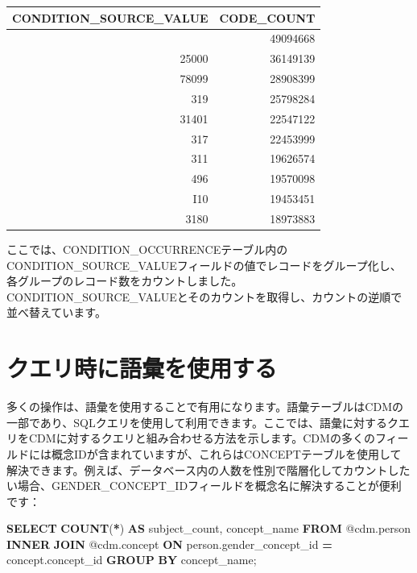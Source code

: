 \documentclass[
  11pt]{book}
\newenvironment{Shaded}{\begin{snugshade}}{\end{snugshade}}
\newcommand{\FunctionTok}[1]{\textcolor[rgb]{0.13,0.29,0.53}{\textbf{#1}}}
\newcommand{\KeywordTok}[1]{\textcolor[rgb]{0.13,0.29,0.53}{\textbf{#1}}}
\newcommand{\NormalTok}[1]{#1}
\newcommand{\OperatorTok}[1]{\textcolor[rgb]{0.81,0.36,0.00}{\textbf{#1}}}
\theoremstyle{definition}
\theoremstyle{definition}
\theoremstyle{definition}
\theoremstyle{definition}
\theoremstyle{remark}
\begin{document}
\begin{longtable}[]{@{}rr@{}}
\toprule\noalign{}
CONDITION\_SOURCE\_VALUE & CODE\_COUNT \\
\midrule\noalign{}
\endhead
\bottomrule\noalign{}
\endlastfoot
4019 & 49094668 \\
25000 & 36149139 \\
78099 & 28908399 \\
319 & 25798284 \\
31401 & 22547122 \\
317 & 22453999 \\
311 & 19626574 \\
496 & 19570098 \\
I10 & 19453451 \\
3180 & 18973883 \\
\end{longtable}

ここでは、CONDITION\_OCCURRENCEテーブル内のCONDITION\_SOURCE\_VALUEフィールドの値でレコードをグループ化し、各グループのレコード数をカウントしました。CONDITION\_SOURCE\_VALUEとそのカウントを取得し、カウントの逆順で並べ替えています。

\section{クエリ時に語彙を使用する}\label{ux30afux30a8ux30eaux6642ux306bux8a9eux5f59ux3092ux4f7fux7528ux3059ux308b}

多くの操作は、語彙を使用することで有用になります。語彙テーブルはCDMの一部であり、SQLクエリを使用して利用できます。ここでは、語彙に対するクエリをCDMに対するクエリと組み合わせる方法を示します。CDMの多くのフィールドには概念IDが含まれていますが、これらはCONCEPTテーブルを使用して解決できます。例えば、データベース内の人数を性別で階層化してカウントしたい場合、GENDER\_CONCEPT\_IDフィールドを概念名に解決することが便利です：

\begin{Shaded}
\begin{Highlighting}[]
\KeywordTok{SELECT} \FunctionTok{COUNT}\NormalTok{(}\OperatorTok{*}\NormalTok{) }\KeywordTok{AS}\NormalTok{ subject\_count,}
\NormalTok{  concept\_name}
\KeywordTok{FROM}\NormalTok{ @cdm.person}
\KeywordTok{INNER} \KeywordTok{JOIN}\NormalTok{ @cdm.concept}
  \KeywordTok{ON}\NormalTok{ person.gender\_concept\_id }\OperatorTok{=}\NormalTok{ concept.concept\_id}
\KeywordTok{GROUP} \KeywordTok{BY}\NormalTok{ concept\_name;}
\end{Highlighting}
\end{Shaded}
\end{document}
